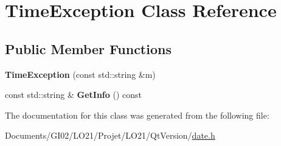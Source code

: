 \hypertarget{class_time_exception}{}\section{Time\+Exception Class Reference}
\label{class_time_exception}
\subsection*{Public Member Functions}
\begin{DoxyCompactItemize}
\item 
\mbox{\label{class_time_exception_a22a2308236c1b525d7910ac582c3a0c4}} 
{\bfseries Time\+Exception} (const std\+::string \&m)
\item 
\mbox{\label{class_time_exception_a4475d44829f2674ec87e2230e2424572}} 
const std\+::string \& {\bfseries Get\+Info} () const
\end{DoxyCompactItemize}


The documentation for this class was generated from the following file\+:\begin{DoxyCompactItemize}
\item 
Documents/\+G\+I02/\+L\+O21/\+Projet/\+L\+O21/\+Qt\+Version/\hyperlink{date_8h}{date.\+h}\end{DoxyCompactItemize}
